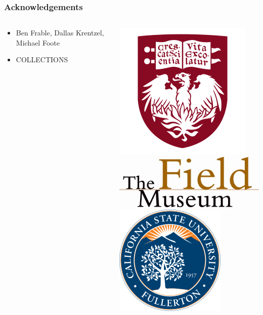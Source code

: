 \documentclass{beamer}\usepackage{graphicx, color}
\begin{document}
\begin{frame}
  \frametitle{Acknowledgements}
  \begin{columns}
    \begin{column}{0.5\textwidth}
      \begin{itemize}
        \item Ben Frable, Dallas Krentzel, Michael Foote
        \item COLLECTIONS
      \end{itemize}
    \end{column}
    \begin{column}{0.5\textwidth}
      \includegraphics[height = 0.25\textheight, keepaspectratio = true]{figure/chicago} \\
      \includegraphics[height = 0.25\textheight, width = \textwidth, keepaspectratio = true]{figure/field} \\
      \includegraphics[height = 0.25\textheight, keepaspectratio = true]{figure/csu}
    \end{column}
  \end{columns}
\end{frame}
\end{document}
